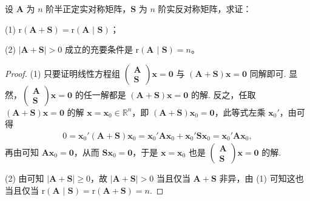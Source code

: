 \documentclass[../../main.tex]{subfiles}%
\begin{document}
\begin{proposition}\label{proposition:半正定与实反称阵关于秩的性质}
设 $\boldsymbol{A}$ 为 $n$ 阶半正定实对称矩阵，$\boldsymbol{S}$ 为 $n$ 阶实反对称矩阵，求证：

(1) $\mathrm{r}\left( \boldsymbol{A}+\boldsymbol{S} \right) =\mathrm{r}\left( \boldsymbol{A}\,\,|\,\,\boldsymbol{S} \right) $；

(2) $|\boldsymbol{A}+\boldsymbol{S}|>0$ 成立的充要条件是 $\mathrm{r}\left( \boldsymbol{A}\,\,|\,\,\boldsymbol{S} \right)=n$。
\end{proposition}
\begin{proof}
(1) 只要证明线性方程组 $\begin{pmatrix}
\boldsymbol{A} \\
\boldsymbol{S}
\end{pmatrix}\boldsymbol{x}=\boldsymbol{0}$ 与 $(\boldsymbol{A}+\boldsymbol{S})\boldsymbol{x}=\boldsymbol{0}$ 同解即可. 显然，$\begin{pmatrix}
\boldsymbol{A} \\
\boldsymbol{S}
\end{pmatrix}\boldsymbol{x}=\boldsymbol{0}$ 的任一解都是 $(\boldsymbol{A}+\boldsymbol{S})\boldsymbol{x}=\boldsymbol{0}$ 的解. 反之，任取 $(\boldsymbol{A}+\boldsymbol{S})\boldsymbol{x}=\boldsymbol{0}$ 的解 $\boldsymbol{x}=\boldsymbol{x}_0\in\mathbb{R}^n$，即 $(\boldsymbol{A}+\boldsymbol{S})\boldsymbol{x}_0=\boldsymbol{0}$，此等式左乘 $\boldsymbol{x}_0'$，由可得
\begin{align*}
0=\boldsymbol{x}_0'(\boldsymbol{A}+\boldsymbol{S})\boldsymbol{x}_0=\boldsymbol{x}_0'\boldsymbol{A}\boldsymbol{x}_0+\boldsymbol{x}_0'\boldsymbol{S}\boldsymbol{x}_0=\boldsymbol{x}_0'\boldsymbol{A}\boldsymbol{x}_0,
\end{align*}
再由可知 $\boldsymbol{A}\boldsymbol{x}_0=\boldsymbol{0}$，从而 $\boldsymbol{S}\boldsymbol{x}_0=\boldsymbol{0}$，于是 $\boldsymbol{x}=\boldsymbol{x}_0$ 也是 $\begin{pmatrix}
\boldsymbol{A} \\
\boldsymbol{S}
\end{pmatrix}\boldsymbol{x}=\boldsymbol{0}$ 的解.

(2) 由可知 $|\boldsymbol{A}+\boldsymbol{S}|\geqslant 0$，故 $|\boldsymbol{A}+\boldsymbol{S}|>0$ 当且仅当 $\boldsymbol{A}+\boldsymbol{S}$ 非异，由 (1) 可知这也当且仅当 $\mathrm{r}\left( \boldsymbol{A}\,\,|\,\,\boldsymbol{S} \right) =\mathrm{r}(\boldsymbol{A}+\boldsymbol{S})=n$.
\end{proof}
\end{document}
